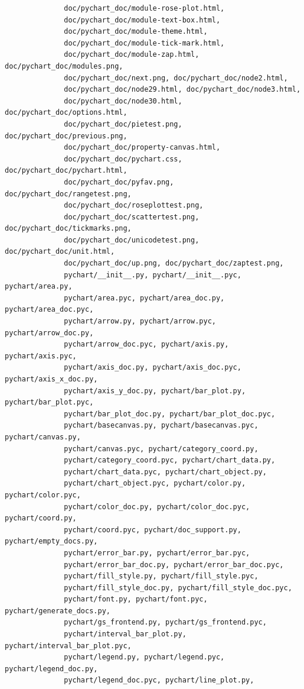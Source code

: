 \documentclass[a4paper]{article}
\begin{document}
\begin{verbatim}
              doc/pychart_doc/module-rose-plot.html,
              doc/pychart_doc/module-text-box.html,
              doc/pychart_doc/module-theme.html,
              doc/pychart_doc/module-tick-mark.html,
              doc/pychart_doc/module-zap.html, doc/pychart_doc/modules.png,
              doc/pychart_doc/next.png, doc/pychart_doc/node2.html,
              doc/pychart_doc/node29.html, doc/pychart_doc/node3.html,
              doc/pychart_doc/node30.html, doc/pychart_doc/options.html,
              doc/pychart_doc/pietest.png, doc/pychart_doc/previous.png,
              doc/pychart_doc/property-canvas.html,
              doc/pychart_doc/pychart.css, doc/pychart_doc/pychart.html,
              doc/pychart_doc/pyfav.png, doc/pychart_doc/rangetest.png,
              doc/pychart_doc/roseplottest.png,
              doc/pychart_doc/scattertest.png, doc/pychart_doc/tickmarks.png,
              doc/pychart_doc/unicodetest.png, doc/pychart_doc/unit.html,
              doc/pychart_doc/up.png, doc/pychart_doc/zaptest.png,
              pychart/__init__.py, pychart/__init__.pyc, pychart/area.py,
              pychart/area.pyc, pychart/area_doc.py, pychart/area_doc.pyc,
              pychart/arrow.py, pychart/arrow.pyc, pychart/arrow_doc.py,
              pychart/arrow_doc.pyc, pychart/axis.py, pychart/axis.pyc,
              pychart/axis_doc.py, pychart/axis_doc.pyc, pychart/axis_x_doc.py,
              pychart/axis_y_doc.py, pychart/bar_plot.py, pychart/bar_plot.pyc,
              pychart/bar_plot_doc.py, pychart/bar_plot_doc.pyc,
              pychart/basecanvas.py, pychart/basecanvas.pyc, pychart/canvas.py,
              pychart/canvas.pyc, pychart/category_coord.py,
              pychart/category_coord.pyc, pychart/chart_data.py,
              pychart/chart_data.pyc, pychart/chart_object.py,
              pychart/chart_object.pyc, pychart/color.py, pychart/color.pyc,
              pychart/color_doc.py, pychart/color_doc.pyc, pychart/coord.py,
              pychart/coord.pyc, pychart/doc_support.py, pychart/empty_docs.py,
              pychart/error_bar.py, pychart/error_bar.pyc,
              pychart/error_bar_doc.py, pychart/error_bar_doc.pyc,
              pychart/fill_style.py, pychart/fill_style.pyc,
              pychart/fill_style_doc.py, pychart/fill_style_doc.pyc,
              pychart/font.py, pychart/font.pyc, pychart/generate_docs.py,
              pychart/gs_frontend.py, pychart/gs_frontend.pyc,
              pychart/interval_bar_plot.py, pychart/interval_bar_plot.pyc,
              pychart/legend.py, pychart/legend.pyc, pychart/legend_doc.py,
              pychart/legend_doc.pyc, pychart/line_plot.py,

\end{verbatim}
\end{document}
